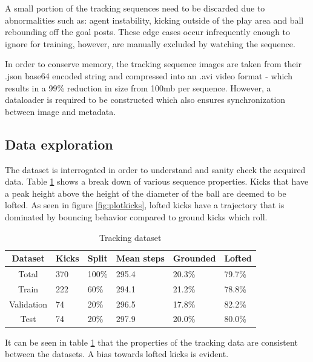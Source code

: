 \documentclass[a4paper,twoside,12pt]{report}
\begin{document}
A small portion of the tracking sequences need to be discarded due to abnormalities such as: agent instability, kicking outside of the play area and ball rebounding off the goal posts. These edge cases occur infrequently enough to ignore for training, however, are manually excluded by watching the sequence. 

In order to conserve memory, the tracking sequence images are taken from their .json base64 encoded string and compressed into an .avi video format - which results in a 99\% reduction in size from 100mb per sequence. However, a dataloader is required to be constructed which also ensures synchronization between image and metadata.

\subsection{Data exploration}

The dataset is interrogated in order to understand and sanity check the acquired data. Table \ref{tab:tracking} shows a break down of various sequence properties. Kicks that have a peak height above the height of the diameter of the ball are deemed to be lofted. As seen in figure \ref{fig:plotkicks}, lofted kicks have a trajectory that is dominated by bouncing behavior compared to ground kicks which roll.

\begin{table}[h!]
\fontsize{9.5pt}{12pt}\selectfont
\centering
\begin{tabular}{c|ll|l|ll}
{\bf Dataset}	&{\bf Kicks}	&{\bf Split}	&{\bf Mean steps}	&{\bf Grounded}	&{\bf Lofted}	\\\hline
Total			&370			&100\%			&295.4			&20.3\%			&79.7\%			\\\hline   
Train			&222			&60\%			&294.1			&21.2\%			&78.8\%			\\\hline  
Validation		&74				&20\%			&296.5			&17.8\%			&82.2\%			\\\hline  
Test			&74				&20\%			&297.9			&20.0\%			&80.0\%			\\\hline                        
\end{tabular}
\caption{Tracking dataset}
\label{tab:tracking}
\end{table}

It can be seen in table \ref{tab:tracking} that the properties of the tracking data are consistent between the datasets. A bias towards lofted kicks is evident.
\end{document}
